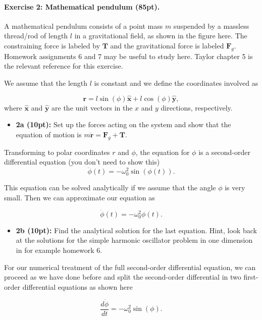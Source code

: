 \documentclass[%
oneside,                 %
final,                   %
10pt]{article}
\begin{document}
\noindent
\paragraph{Exercise 2: Mathematical pendulum (85pt).}
A mathematical pendulum consists of a point mass $m$ suspended by a
massless thread/rod of length $l$ in a gravitational field, as shown
in the figure here. The constraining force is labeled by $\bm{T}$ and
the gravitational force is labeled $\bm{F}_g$.  Homework assignments 6 and 7 may be useful to study here. Taylor chapter 5 is the relevant reference for this exercise.


We assume that the length $l$ is constant and we define the coordinates involved as

\[
\bm{r} = l\sin(\phi)\bm{\hat{x}}+l\cos(\phi)\bm{\hat{y}},
\]
where $\bm{\hat{x}}$ and $\bm{\hat{y}}$ are the unit vectors in the $x$ and $y$ directions, respectively.

\begin{itemize}
\item \textbf{2a (10pt):} Set up the forces acting on the system and show that the equation of motion is $m\ddot{\bm{r}}=\bm{F}_g+\bm{T}$.
\end{itemize}

\noindent
Transforming to polar coordinates $r$ and $\phi$, 
the equation for $\phi$ is a second-order differential equation (you don't need to show this)
\[
\ddot{\phi}(t)=-\omega_0^2\sin{(\phi(t))}.
\]

This equation can be solved analytically if we assume that the angle $\phi$ is very small. Then we can approximate our equation as

\[
\ddot{\phi}(t)=-\omega_0^2\phi(t).
\]

\begin{itemize}
\item \textbf{2b (10pt):} Find the analytical solution for the last equation. Hint, look back at the solutions for the simple harmonic oscillator problem in one dimension in for example homework 6.
\end{itemize}

\noindent
For our numerical treatment of the full second-order differential  equation, we can proceed as we have done before and split the second-order differential in two first-order differential equations
as shown here

\[
\frac{d\dot{\phi}}{dt}=-\omega_0^2\sin{(\phi)}.
\]
\end{document}
